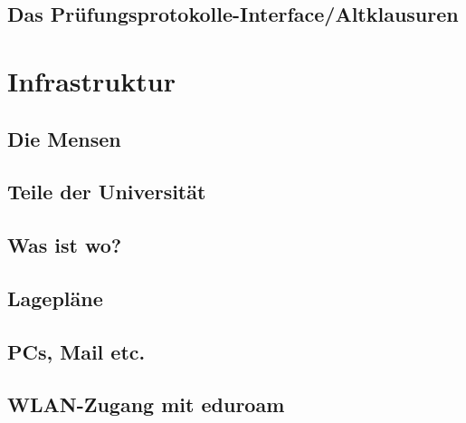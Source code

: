 \documentclass[12pt, a4paper]{article}
\newif\ifinfo
\begin{document}
\subsection{Das Prüfungsprotokolle-Interface/Altklausuren}

\ifinfo
\else
	\vfill
\fi

\ifinfo
	\subsection{Praktika}
	
\fi

\pagebreak

\section{Infrastruktur}
\subsection{Die Mensen}


\subsection{Teile der Universität}
\ifinfo
	
\else
	
\fi

\pagebreak

\subsection{Was ist wo?}
\ifinfo
	
\else
	
\fi

\newpage
\subsection{Lagepläne}
\ifinfo
	
\else
	
\fi
\newpage

\subsection{PCs, Mail etc.}
	
\subsection{WLAN-Zugang mit eduroam}
	
\end{document}
